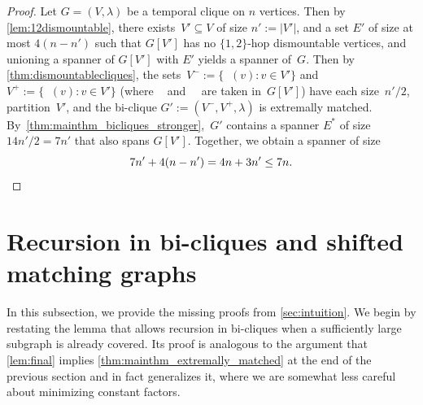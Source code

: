 \documentclass[11pt, letterpaper]{article}
\DeclareMathOperator{\minmat}{N_{\mathrm{min}}}
\DeclareMathOperator{\maxmat}{N_{\mathrm{max}}}
\theoremstyle{definition}
\theoremstyle{plain}
\begin{document}
\mainthm*

\begin{proof}
Let $G=(V,\lambda)$ be a temporal clique on $n$ vertices. 
Then by \cref{lem:12dismountable}, there exists~${V'\subseteq V}$ of size $n':=|V'|$, and a set $E'$ of size at most $4(n-n')$ such that $G[V']$ has no $\{1,2\}$-hop dismountable vertices, and unioning a spanner of $G[V']$ with $E'$ yields a spanner of~$G$.
Then by \cref{thm:dismountablecliques}, the sets~$V^-:=\{\minmat(v): v \in V'\}$ and $V^+:=\{\maxmat(v): v \in V'\}$ (where $\minmat$ and~$\maxmat$ are taken in~$G[V']$) have each size~$n'/2$, partition~$V'$, and the bi-clique $G':=(V^-, V^+,\lambda)$ is extremally matched.
By~\cref{thm:mainthm_bicliques_stronger},~$G'$ contains a spanner $E^*$ of size $14n'/2=7n'$ that also spans $G[V']$.
Together, we obtain a spanner of size
\begin{equation*}
7n' + 4(n-n') = 4n + 3 n' \leq 7n.\qedhere
\end{equation*}
\end{proof}






\section{Recursion in bi-cliques and shifted matching graphs}
\label{sec:shifted_matching_proofs}

In this subsection, we provide the missing proofs from \cref{sec:intuition}.
We begin by restating the lemma that allows recursion in bi-cliques when a sufficiently large subgraph is already covered. Its proof is analogous to the argument that \cref{lem:final} implies \cref{thm:mainthm_extremally_matched} at the end of the previous section and in fact generalizes it, where we are somewhat less careful about minimizing constant factors.

\recursionlemma*
\end{document}
